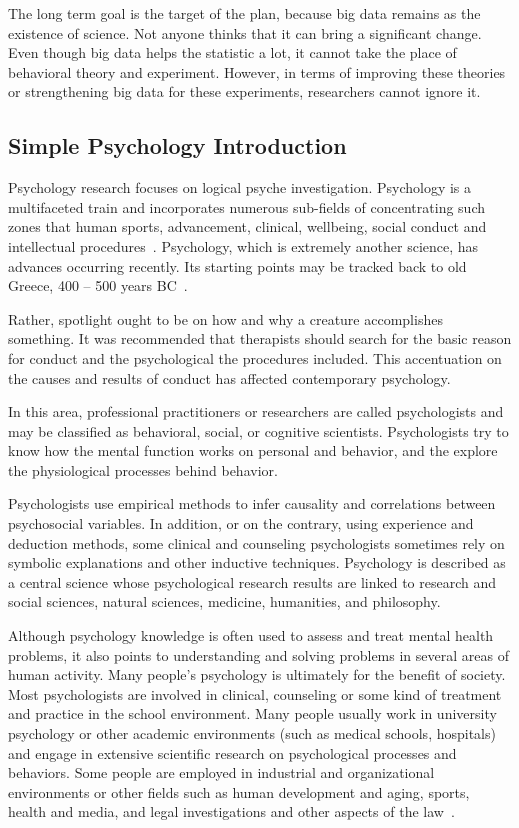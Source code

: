 The long term goal is the target of the plan, because big data 
remains as the existence of science. Not anyone thinks that it can 
bring a significant change. Even though big data helps the 
statistic a lot, 
it cannot take the place of behavioral theory and experiment. 
However, in terms of improving these theories or strengthening 
big data for these experiments, researchers cannot ignore it.

\subsection{Simple Psychology Introduction}

Psychology research focuses on logical psyche investigation. 
Psychology is a multifaceted train and incorporates 
numerous sub-fields of concentrating 
such zones that human sports, advancement, clinical, wellbeing, 
social conduct and intellectual 
procedures~\cite{hid515-01}. Psychology, which is extremely another 
science, has advances occurring recently. Its starting
points may be tracked back to old Greece, 400 – 500 years 
BC~\cite{hid515-01}. 

Rather, spotlight ought to be on how and why a creature 
accomplishes something. It was recommended that therapists should 
search for the basic reason for conduct and the psychological the 
procedures included. This accentuation on the causes and results of
 conduct has affected contemporary psychology.

In this area, professional practitioners or researchers are called 
psychologists and may be classified as behavioral, social, or 
cognitive scientists. Psychologists try to know how the  
mental function works on personal and behavior, and the explore 
the physiological processes behind behavior.

Psychologists use empirical methods to infer causality and 
correlations between psychosocial variables. 
In addition, or on the contrary, using experience and deduction 
methods, some clinical and counseling psychologists sometimes rely
 on symbolic explanations and other inductive techniques. 
Psychology is described as a central science whose psychological 
research results are linked to research and social sciences, 
natural sciences, medicine, humanities, and philosophy.

Although psychology knowledge is often used to assess and treat 
mental health problems, it also points to understanding and solving
problems in several areas of human activity. Many people's 
psychology
 is ultimately for the benefit of society. Most psychologists are 
involved in clinical, counseling or some kind of treatment and 
practice in the school environment. Many people usually work in 
university psychology or other academic environments (such as medical
 schools, hospitals) and engage in extensive scientific research on
 psychological processes and behaviors. Some people are employed in
 industrial and organizational environments or other fields such as
 human development and aging, sports, health and media, and 
legal investigations and other aspects of the law~\cite{hid515-19}.

